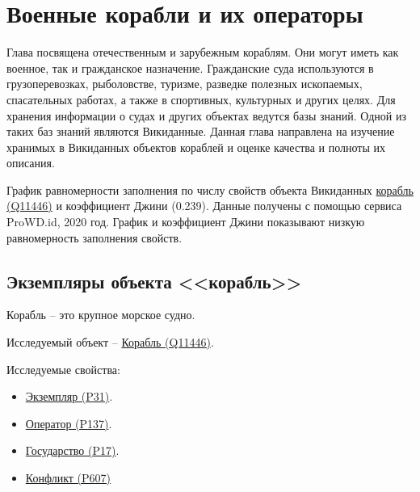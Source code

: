 \chapter{Военные корабли и их операторы}
\label{ch:ships-chapter}

Глава посвящена отечественным и зарубежным кораблям. Они могут иметь как военное, так и гражданское назначение. Гражданские суда используются в грузоперевозках, рыболовстве, туризме, разведке полезных ископаемых, спасательных работах, а также в спортивных, культурных и других целях. Для хранения информации о судах и других объектах ведутся базы знаний. Одной из таких баз знаний являются Викиданные. Данная глава направлена на изучение хранимых в Викиданных объектов кораблей и оценке качества и полноты их описания.


\begin{marginfigure}[0.0cm]
  {
    \setlength{\fboxsep}{0pt}%
    \setlength{\fboxrule}{1pt}%
  }
  \caption{
    График равномерности заполнения по числу свойств объекта Викиданных \href{https://www.wikidata.org/wiki/Q11446}{корабль (Q11446)} и коэффициент Джини (0.239). Данные получены с помощью сервиса ProWD.id, 2020 год. График и коэффициент Джини показывают низкую равномерность заполнения свойств.
    }%
    \label{fig:prowd_ships-unbalanced}%
  \end{marginfigure}


\section{Экземпляры объекта <<корабль>>}

Корабль -- это крупное морское судно.

Исследуемый объект -- \href{https://www.wikidata.org/wiki/Q11446}{Корабль (Q11446)}.

Исследуемые свойства:
\begin{itemize}
  \item \href{https://www.wikidata.org/wiki/Property:P31}{Экземпляр (P31)}.
  \item \href{https://www.wikidata.org/wiki/Property:P137}{Оператор (P137)}.
  \item \href{https://www.wikidata.org/wiki/Property:P17}{Государство (P17)}.
  \item \href{https://www.wikidata.org/wiki/Property:P607}{Конфликт (P607)}
\end{itemize}

